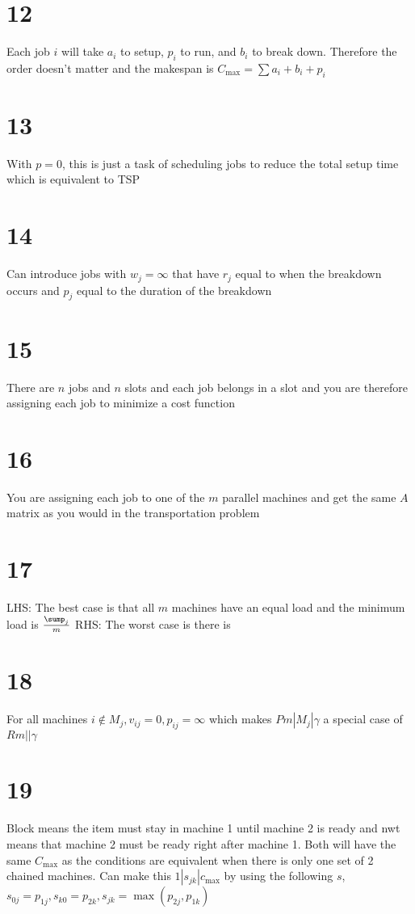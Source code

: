 \documentclass[11pt]{article}
\begin{document}
\section*{12}
Each job $i$ will take $a_i$ to setup, $p_i$ to run, and $b_i$ to break down. Therefore the order doesn't matter and the makespan is $C_{\max}=\sum a_i + b_i + p_i$

\section*{13}
With $p=0$, this is just a task of scheduling jobs to reduce the total setup time which is equivalent to TSP

\section*{14}
Can introduce jobs with $w_j=\infty$ that have $r_j$ equal to when the breakdown occurs and $p_j$ equal to the duration of the breakdown

\section*{15}
There are $n$ jobs and $n$ slots and each job belongs in a slot and you are therefore assigning each job to minimize a cost function

\section*{16}
You are assigning each job to one of the $m$ parallel machines and get the same $A$ matrix as you would in the transportation problem

\section*{17}
LHS: The best case is that all $m$ machines have an equal load and the minimum load is $\frac{\sump_j}{m}$
RHS: The worst case is there is

\section*{18}
For all machines $i \notin M_j, v_{ij}=0, p_{ij}=\infty$ which makes $Pm | M_j | \gamma$ a special case of $Rm || \gamma$

\section*{19}
Block means the item must stay in machine 1 until machine 2 is ready and nwt means that machine 2 must be ready right after machine 1.
Both will have the same $C_\max$ as the conditions are equivalent when there is only one set of 2 chained machines.
Can make this $1 | s_{jk} | c_\max$ by using the following $s$, $s_{0j} = p_{1j}, s_{k0} = p_{2k}, s_{jk} = \max(p_{2j}, p_{1k})$
\end{document}
